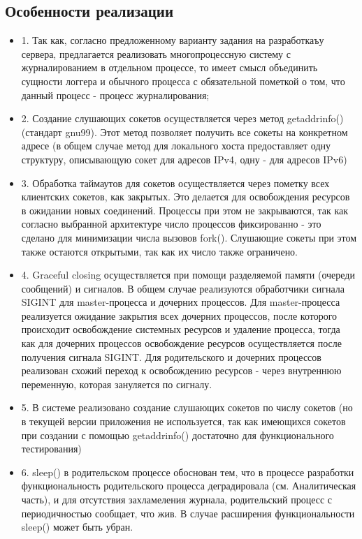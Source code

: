 \documentclass[a4paper,12pt]{report}
\begin{document}
\subsection{Особенности реализации}
\begin{itemize}
    \item 1. Так как, согласно предложенному варианту задания на разработкаъу сервера, предлагается реализовать многопроцессную систему с журналированием в отдельном процессе, то имеет смысл объединить сущности логгера и обычного процесса с обязательной пометкой о том, что данный процесс - процесс журналирования;
    \item 2. Создание слушающих сокетов осуществляется через метод getaddrinfo() (стандарт gnu99). Этот метод позволяет получить все сокеты на конкретном адресе (в общем случае метод для локального хоста предоставляет одну структуру, описывающую сокет для адресов IPv4, одну - для адресов IPv6)
    \item 3. Обработка таймаутов для сокетов осуществляется через пометку всех клиентских сокетов, как закрытых. Это делается для освобождения ресурсов в ожидании новых соединений. Процессы при этом не закрываются, так как согласно выбранной архитектуре число процессов фиксированно - это сделано для минимизации числа вызовов fork(). Слушающие сокеты при этом также остаются открытыми, так как их число также ограничено.
    \item 4. Graceful closing  осуществляется при помощи разделяемой памяти (очереди сообщений) и сигналов. В общем случае реализуются обработчики сигнала SIGINT для master-процесса и дочерних процессов. Для master-процесса реализуется ожидание закрытия всех дочерних процессов, после которого происходит освобождение системных ресурсов и удаление процесса, тогда как для дочерних процессов освобождение ресурсов осуществляется после получения сигнала SIGINT. Для родительского и дочерних процессов реализован схожий переход к освобождению ресурсов - через внутреннюю переменную, которая зануляется по сигналу.
    \item 5. В системе реализовано создание слушающих сокетов по числу сокетов (но в текущей версии приложения не используется, так как имеющихся сокетов при создании с помощью getaddrinfo() достаточно для функционального тестирования)
    \item 6. sleep() в родительском процессе обоснован тем, что в процессе разработки функциональность родительского процесса деградировала (см. Аналитическая часть), и для отсутствия захламеления журнала, родительский процесс с периодичностью сообщает, что жив. В случае расширения функциональности sleep() может быть убран.

\end{itemize}
\end{document}
